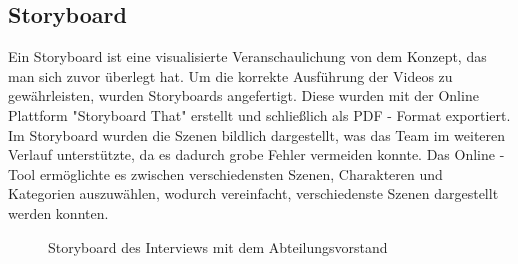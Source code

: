 \subsection{Storyboard}
Ein Storyboard ist eine visualisierte Veranschaulichung von dem Konzept, das man sich zuvor überlegt hat.\citep{storyboard} Um die korrekte Ausführung der Videos zu gewährleisten, wurden Storyboards angefertigt. Diese wurden mit der Online Plattform "Storyboard That"\citep{storyboardLink} erstellt und schließlich als PDF - Format exportiert.
Im Storyboard wurden die Szenen bildlich dargestellt, was das Team im weiteren Verlauf unterstützte, da es dadurch grobe Fehler vermeiden konnte.
Das Online - Tool ermöglichte es zwischen verschiedensten Szenen, Charakteren und Kategorien auszuwählen, wodurch vereinfacht, verschiedenste Szenen dargestellt werden konnten. 
\begin{figure}[H]
\begin{center}
	\caption{Storyboard des Interviews mit dem Abteilungsvorstand}
\end{center}
\end{figure}
